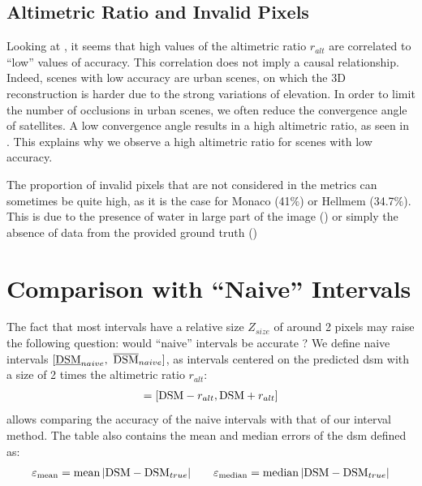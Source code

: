 \subsection{Altimetric Ratio and Invalid Pixels}
Looking at , it seems that high values of the altimetric ratio $r_{alt}$ are correlated to ``low'' values of accuracy. This correlation does not imply a causal relationship. Indeed, scenes with low accuracy are urban scenes, on which the 3D reconstruction is harder due to the strong variations of elevation. In order to limit the number of occlusions in urban scenes, we often reduce the convergence angle of satellites. A low convergence angle results in a high altimetric ratio, as seen in . This explains why we observe a high altimetric ratio for scenes with low accuracy.

The proportion of invalid pixels that are not considered in the metrics can sometimes be quite high, as it is the case for Monaco (41$\%$) or Hellmem (34.7$\%$). This is due to the presence of water in large part of the image () or simply the absence of data from the provided ground truth ()

\section{Comparison with ``Naive'' Intervals}
The fact that most intervals have a relative size $Z_{size}$ of around 2 pixels may raise the following question: would ``naive'' intervals be accurate ? We define naive intervals $[\underline{\mathrm{DSM}}_{naive}, ~\overline{\mathrm{DSM}}_{naive}]$, as intervals centered on the predicted \acrshort{dsm} with a size of 2 times the altimetric ratio $r_{alt}$:
\begin{align}
    [\underline{\DSM}_{naive}, ~\overline{\DSM}_{naive}] = [\DSM-r_{alt}, \DSM+r_{alt}]
\end{align}
 allows comparing the accuracy of the naive intervals with that of our interval method. The table also contains the mean and median errors of the \acrshort{dsm} defined as:
\begin{align}
    \varepsilon_{\operatorname*{mean}} = \operatorname*{mean}|\mathrm{DSM} - \mathrm{DSM}_{true}|\qquad \varepsilon_{\operatorname*{median}} = \operatorname*{median}|\mathrm{DSM} - \mathrm{DSM}_{true}|
\end{align}

